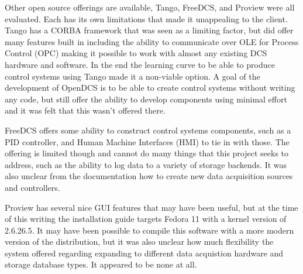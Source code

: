     Other open source offerings are available, Tango, FreeDCS, and Proview were
    all evaluated. Each has its own limitations that made it unappealing to the
    client. Tango has a CORBA framework that was seen as a limiting factor, but
    did offer many features built in including the ability to communicate over
    OLE for Process Control (OPC) making it possible to work with almost any
    existing DCS hardware and software. In the end the learning curve to be
    able to produce control systems using Tango made it a non-viable option. A
    goal of the development of OpenDCS is to be able to create control systems
    without writing any code, but still offer the ability to develop components
    using minimal effort and it was felt that this wasn't offered there.

    FreeDCS offers some ability to construct control systems components, such
    as a PID controller, and Human Machine Interfaces (HMI) to tie in with
    those.  The offering is limited though and cannot do many things that this
    project seeks to address, such as the ability to log data to a variety of
    storage backends. It was also unclear from the documentation how to create
    new data acquisition sources and controllers.

    Proview has several nice GUI features that may have been useful, but at the
    time of this writing the installation guide targets Fedora 11 with a kernel
    version of 2.6.26.5. It may have been possible to compile this software
    with a more modern version of the distribution, but it was also unclear how
    much flexibility the system offered regarding expanding to different data
    acquistion hardware and storage database types. It appeared to be none at
    all.
